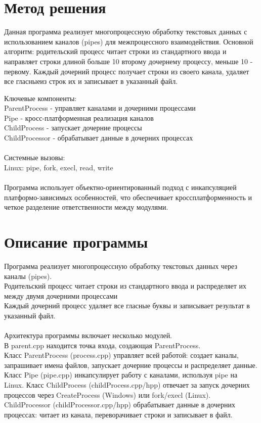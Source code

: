 \section{Метод решения}
Данная программа реализует многопроцессную обработку текстовых данных с использованием каналов (pipes) для межпроцессного взаимодействия.
Основной алгоритм: родительский процесс читает строки из стандартного ввода и направляет строки длиной больше 10 второму дочернему процессу, меньше 10 - первому. Каждый дочерний процесс получает строки из своего канала, удаляет все гласныеиз строк их и записывает в указанный файл.

Ключевые компоненты:\\
ParentProcess - управляет каналами и дочерними процессами\\
Pipe - кросс-платформенная реализация каналов\\
ChildProcess - запускает дочерние процессы\\
ChildProcessor - обрабатывает данные в дочерних процессах\\
\\
Системные вызовы:\\
Linux: pipe, fork, execl, read, write\\
\\
Программа использует объектно-ориентированный подход с инкапсуляцией платформо-зависимых особенностей, что обеспечивает кроссплатформенность и четкое разделение ответственности между модулями.

\section{Описание программы}
Программа реализует многопроцессную обработку текстовых данных через каналы (pipes). \\
Родительский процесс читает строки из стандартного ввода и распределяет их между двумя дочерними процессами \\
Каждый дочерний процесс удаляет все гласные буквы и записывает результат в указанный файл.\\
\\
Архитектура программы включает несколько модулей. \\
В parent.cpp находится точка входа, создающая ParentProcess. \\
Класс ParentProcess (process.cpp) управляет всей работой: создает каналы, запрашивает имена файлов, запускает дочерние процессы и распределяет данные. \\
Класс Pipe (pipe.cpp) инкапсулирует работу с каналами, используя pipe на Linux. Класс ChildProcess (childProcess.cpp/hpp) отвечает за запуск дочерних процессов через CreateProcess (Windows) или fork/execl (Linux). \\
ChildProcessor (childProcessor.cpp/hpp) обрабатывает данные в дочерних процессах: читает из канала, переворачивает строки и записывает в файл.\\